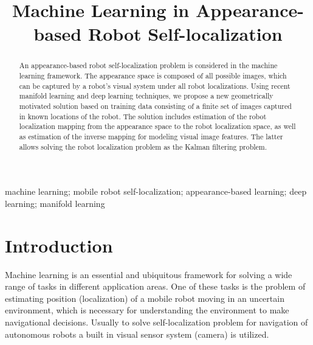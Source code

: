\documentclass[conference]{IEEEtran} %
\begin{document}
\title{Machine Learning in Appearance-based Robot Self-localization}

\author{

}


\maketitle              %

\begin{abstract} An appearance-based robot self-localization problem is considered in the machine learning framework. The appearance space is composed of all possible images, which can be captured by a robot's visual system under all robot localizations. Using recent manifold learning and deep learning techniques, we propose a new geometrically motivated solution based on training data consisting of a finite set of images captured in known locations of the robot. The solution includes estimation of the robot localization mapping from the appearance space to the robot localization space, as well as estimation of the inverse mapping for modeling visual image features. The latter allows solving the robot localization problem as the Kalman filtering problem.
\end{abstract}

\begin{IEEEkeywords}
	machine learning; mobile robot self-localization; appearance-based learning; deep learning; manifold learning
\end{IEEEkeywords}
\section{Introduction}
\label{sec1}

Machine learning is an essential and ubiquitous framework for solving a wide range of tasks in different application areas. One of these tasks is the problem of estimating position (localization) of a mobile robot moving in an uncertain environment, which is necessary for understanding the environment to make navigational decisions. Usually to solve self-localization problem for navigation of autonomous robots a built in visual sensor system (camera) is utilized.
\end{document}
